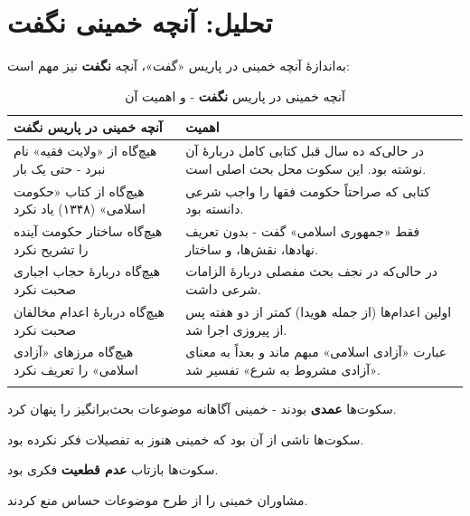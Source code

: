 \documentclass[12pt,a4paper]{book}
\newcommand{\keyword}[1]{\textbf{\textcolor{cPrimary}{#1}}}
\begin{document}
\section{تحلیل: آنچه خمینی \keyword{نگفت}}

به‌اندازهٔ آنچه خمینی در پاریس «گفت»، آنچه \keyword{نگفت} نیز مهم است:

\begin{longtable}{%
    >{\raggedleft\arraybackslash}p{}
    >{\raggedleft\arraybackslash}p{}}
\toprule
\rowcolor{cAccent!10}
\textbf{آنچه خمینی در پاریس نگفت} & \textbf{اهمیت} \\
\midrule
\endhead

هیچ‌گاه از «ولایت فقیه» نام نبرد - حتی یک بار &
در حالی‌که ده سال قبل کتابی کامل دربارهٔ آن نوشته بود. این سکوت محل بحث اصلی است. \\
\midrule

هیچ‌گاه از کتاب «حکومت اسلامی» (۱۳۴۸) یاد نکرد &
کتابی که صراحتاً حکومت فقها را واجب شرعی دانسته بود. \\
\midrule

هیچ‌گاه ساختار حکومت آینده را تشریح نکرد &
فقط «جمهوری اسلامی» گفت - بدون تعریف نهادها، نقش‌ها، و ساختار. \\
\midrule

هیچ‌گاه دربارهٔ حجاب اجباری صحبت نکرد &
در حالی‌که در نجف بحث مفصلی دربارهٔ الزامات شرعی داشت. \\
\midrule

هیچ‌گاه دربارهٔ اعدام مخالفان صحبت نکرد &
اولین اعدام‌ها (از جمله هویدا) کمتر از دو هفته پس از پیروزی اجرا شد. \\
\midrule

هیچ‌گاه مرزهای «آزادی اسلامی» را تعریف نکرد &
عبارت «آزادی اسلامی» مبهم ماند و بعداً به معنای «آزادی مشروط به شرع» تفسیر شد. \\

\bottomrule
\caption{آنچه خمینی در پاریس \textbf{نگفت} - و اهمیت آن}
\label{tab:paris-silences}
\end{longtable}

\begin{warningBox}
\begin{description}[style=nextline, font=\bfseries\color{cPrimary}]
    \item[تز ۲ (خدعه):] سکوت‌ها \keyword{عمدی} بودند - خمینی آگاهانه موضوعات بحث‌برانگیز را پنهان کرد.
    \item[تز ۱ (صداقت):] سکوت‌ها ناشی از آن بود که خمینی هنوز به تفصیلات فکر نکرده بود.
    \item[تز ۳ (تکامل):] سکوت‌ها بازتاب \keyword{عدم قطعیت} فکری بود.
    \item[تز ۴ (نخبگان):] مشاوران خمینی را از طرح موضوعات حساس منع کردند.
\end{description}
\end{warningBox}
\end{document}
